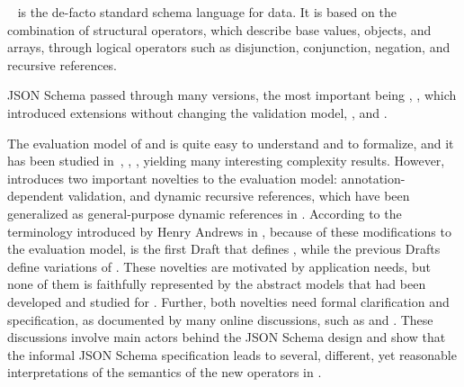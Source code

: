 {\jsonsch}~\citep{jsonschema} is the de-facto standard schema language for {\json} data.
It is based on the combination of structural operators, which describe base values,
objects, and arrays, through logical operators such as disjunction, conjunction, negation, 
and recursive references.

JSON Schema passed through many versions, the most important being 
{\DFour} \citep{Draft04}, %
{\DSix}  \citep{Draft06}, which introduced extensions without changing the validation model,  
{\DNineteen}  \citep{Version09},  and {\DTwenty} \citep{specs2020}. %

The evaluation model of {\DFour} and {\DSix} is quite easy to understand and to formalize, 
and it has been studied in~\citep{DBLP:conf/www/PezoaRSUV16}, \citep{DBLP:conf/pods/BourhisRSV17,DBLP:journals/is/BourhisRV20},
\citep{DBLP:journals/pvldb/AttoucheBCGSS22}, yielding many interesting complexity results.
However, {\DNineteen} introduces two important novelties to the evaluation model: annotation-dependent validation, and dynamic recursive references, which have been generalized as general-purpose dynamic references in {\DTwenty}.
According to the terminology introduced by Henry Andrews in  
, because of these modifications to the evaluation model,
{\DNineteen} is the first 
Draft that defines \emph{\mJS}, while the previous Drafts define variations of \emph{{\cJS}}.
These novelties are motivated by application needs, but none of them is faithfully represented by the abstract models that had been developed and
studied for {\cJS}. Further, both novelties need formal clarification and specification, as documented by many online discussions, such as {\citeoneone} and {\citefiveseven}.
These discussions involve main actors behind the JSON Schema design and show that the informal JSON Schema specification leads to several, different, yet reasonable interpretations of the semantics of the new operators in {\mJS}.




